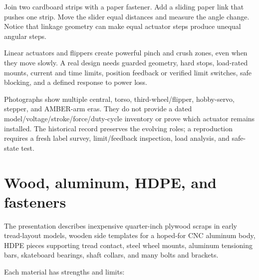 \documentclass[11pt,openany]{book}
\begin{document}
\begin{buildbox}[title={CARDBOARD LINKAGE}]
Join two cardboard strips with a paper fastener. Add a sliding paper link that pushes one strip. Move the slider equal distances and measure the angle change. Notice that linkage geometry can make equal actuator steps produce unequal angular steps.
\end{buildbox}

\begin{safetybox}
Linear actuators and flippers create powerful pinch and crush zones, even when they move slowly. A real design needs guarded geometry, hard stops, load-rated mounts, current and time limits, position feedback or verified limit switches, safe blocking, and a defined response to power loss.
\end{safetybox}


\begin{fieldnotebox}[title={ACTUATOR ERAS, NOT A PARTS SCHEDULE}]
Photographs show multiple central, torso, third-wheel/flipper, hobby-servo, stepper, and AMBER-arm eras. They do not provide a dated model/voltage/stroke/force/duty-cycle inventory or prove which actuator remains installed. The historical record preserves the evolving roles; a reproduction requires a fresh label survey, limit/feedback inspection, load analysis, and safe-state test.
\end{fieldnotebox}


\chapter{Wood, aluminum, HDPE, and fasteners}

The presentation describes inexpensive quarter-inch plywood scraps in early tread-layout models, wooden side templates for a hoped-for CNC aluminum body, HDPE pieces supporting tread contact, steel wheel mounts, aluminum tensioning bars, skateboard bearings, shaft collars, and many bolts and brackets.

Each material has strengths and limits:
\end{document}
